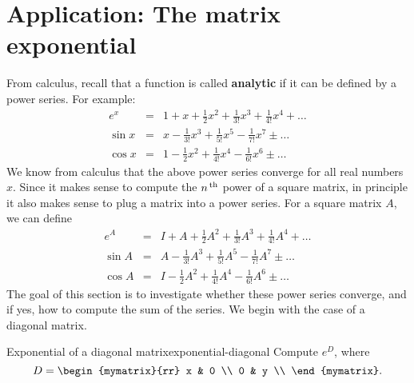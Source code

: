 \section{Application: The matrix exponential}

From calculus, recall that a function is called \textbf{analytic}%
 if it can be defined by a power series. For example:
\begin{eqnarray*}
  e^{x} &=& 1 + x + \frac{1}{2}x^2 + \frac{1}{3!}x^3 + \frac{1}{4!}x^4 + \ldots \\
  \sin x &=& x - \frac{1}{3!}x^3 + \frac{1}{5!}x^5 - \frac{1}{7!}x^7 \pm \ldots \\
  \cos x &=& 1 - \frac{1}{2}x^2 + \frac{1}{4!}x^4 - \frac{1}{6!}x^6 \pm \ldots
\end{eqnarray*}
We know from calculus that the above power series converge for all
real numbers $x$. Since it makes sense to compute the $n^{\,\rm th}$ power of
a square matrix, in principle it also makes sense to plug a matrix
into a power series. For a square matrix $A$, we can define
\begin{eqnarray*}
  e^{A} &=& I + A + \frac{1}{2}A^2 + \frac{1}{3!}A^3 + \frac{1}{4!}A^4 + \ldots \\
  \sin A &=& A - \frac{1}{3!}A^3 + \frac{1}{5!}A^5 - \frac{1}{7!}A^7 \pm \ldots \\
  \cos A &=& I - \frac{1}{2}A^2 + \frac{1}{4!}A^4 - \frac{1}{6!}A^6 \pm \ldots
\end{eqnarray*}
The goal of this section is to investigate whether these power series
converge, and if yes, how to compute the sum of the series. We begin
with the case of a diagonal matrix.

\begin{example}{Exponential of a diagonal matrix}{exponential-diagonal}
  Compute $e^{D}$, where
  \begin{equation*}
    D = \begin{mymatrix}{rr}
      x & 0 \\
      0 & y \\
    \end{mymatrix}.
  \end{equation*}
\end{example}

